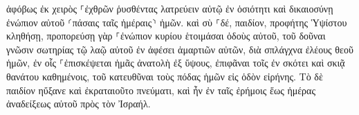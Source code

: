 \documentclass{openreader}
\begin{document}
ἀφόβως ἐκ χειρὸς ⸀ἐχθρῶν ῥυσθέντας λατρεύειν αὐτῷ 
ἐν ὁσιότητι καὶ δικαιοσύνῃ ἐνώπιον αὐτοῦ ⸂πάσαις ταῖς ἡμέραις⸃ ἡμῶν. 
καὶ σὺ ⸀δέ, παιδίον, προφήτης Ὑψίστου κληθήσῃ, προπορεύσῃ γὰρ ⸀ἐνώπιον κυρίου ἑτοιμάσαι ὁδοὺς αὐτοῦ, 
τοῦ δοῦναι γνῶσιν σωτηρίας τῷ λαῷ αὐτοῦ ἐν ἀφέσει ἁμαρτιῶν αὐτῶν, 
διὰ σπλάγχνα ἐλέους θεοῦ ἡμῶν, ἐν οἷς ⸀ἐπισκέψεται ἡμᾶς ἀνατολὴ ἐξ ὕψους, 
ἐπιφᾶναι τοῖς ἐν σκότει καὶ σκιᾷ θανάτου καθημένοις, τοῦ κατευθῦναι τοὺς πόδας ἡμῶν εἰς ὁδὸν εἰρήνης. 
Τὸ δὲ παιδίον ηὔξανε καὶ ἐκραταιοῦτο πνεύματι, καὶ ἦν ἐν ταῖς ἐρήμοις ἕως ἡμέρας ἀναδείξεως αὐτοῦ πρὸς τὸν Ἰσραήλ. 
\end{document}
